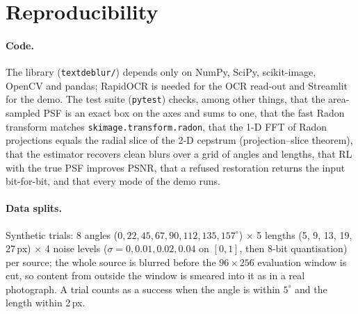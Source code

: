 \section{Reproducibility}
\label{app:repro}

\paragraph{Code.} The library (\texttt{textdeblur/}) depends only on NumPy, SciPy, scikit-image,
OpenCV and pandas; RapidOCR is needed for the OCR read-out and Streamlit for the demo. The test
suite (\texttt{pytest}) checks, among other things, that the area-sampled PSF is an exact box on the
axes and sums to one, that the fast Radon transform matches \texttt{skimage.transform.radon}, that
the 1-D FFT of Radon projections equals the radial slice of the 2-D cepstrum (projection--slice
theorem), that the estimator recovers clean blurs over a grid of angles and lengths, that RL with the
true PSF improves PSNR, that a refused restoration returns the input bit-for-bit, and that every mode
of the demo runs.

\paragraph{Data splits.}
\begin{center}
\small
{}
\end{center}
Synthetic trials: 8 angles ($0, 22, 45, 67, 90, 112, 135, 157^\circ$) $\times$ 5 lengths
(5, 9, 13, 19, 27\,px) $\times$ 4 noise levels ($\sigma = 0, 0.01, 0.02, 0.04$ on $[0,1]$, then 8-bit
quantisation) per source; the whole source is blurred before the $96\times256$ evaluation window is
cut, so content from outside the window is smeared into it as in a real photograph. A trial counts as
a success when the angle is within $5^\circ$ and the length within 2\,px.

